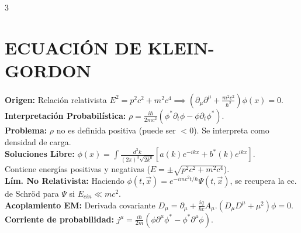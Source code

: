 \documentclass[8pt,a4paper,fleqn]{extarticle} %
\begin{document}
\begin{multicols}{3}
\section{ECUACIÓN DE KLEIN-GORDON}
\textbf{Origen:} Relación relativista $E^2 = p^2c^2 + m^2c^4 \implies \left( \partial_\mu \partial^\mu + \frac{m^2c^2}{\hbar^2} \right) \phi(x) = 0$.\\
\textbf{Interpretación Probabilística:}
$\rho = \frac{i\hbar}{2mc^2} (\phi^* \partial_t \phi - \phi \partial_t \phi^*)$.
\\\textbf{Problema:} $\rho$ no es definida positiva (puede ser $<0$). Se interpreta como densidad de carga.\\
\textbf{Soluciones Libre:} $\phi(x) = \int \frac{d^3k}{(2\pi)^3 \sqrt{2k^0}} [ a(k) e^{-ikx} + b^*(k) e^{ikx} ]$.\\
Contiene energías positivas y negativas ($E = \pm \sqrt{p^2c^2+m^2c^4}$).\\
\textbf{Lím. No Relativista:} Haciendo $\phi(t, \vec{x}) = e^{-imc^2t/\hbar} \Psi(t, \vec{x})$, se recupera la ec. de Schröd para $\Psi$ si $E_{cin} \ll mc^2$.\\
\textbf{Acoplamiento EM:} Derivada covariante $D_\mu = \partial_\mu + \frac{iq}{\hbar c} A_\mu.  (D_\mu D^\mu + \mu^2) \phi = 0$.
\\\textbf{Corriente de probabilidad:} $j^\mu = \frac{i\hbar}{2m} (\phi \partial^\mu \phi^* - \phi^* \partial^\mu \phi)$.



\end{multicols}
\end{document}
